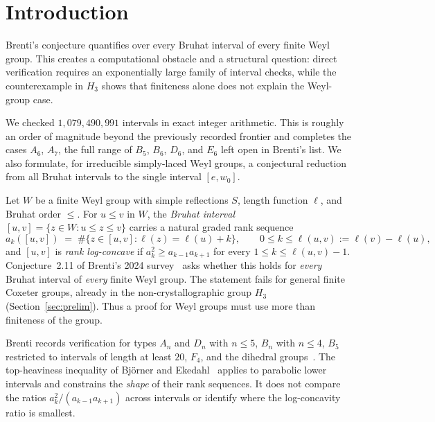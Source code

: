 \documentclass[11pt]{amsart}
\theoremstyle{plain}
\theoremstyle{definition}
\theoremstyle{remark}
\newcommand{\W}{W}
\begin{document}

\maketitle

\section{Introduction}
\label{sec:intro}

Brenti's conjecture quantifies over every Bruhat interval of every finite
Weyl group. This creates a computational obstacle and a structural
question: direct verification requires an exponentially large family of
interval checks, while the counterexample in $H_3$ shows that finiteness
alone does not explain the Weyl-group case.

We checked $1{,}079{,}490{,}991$ intervals in exact integer arithmetic.
This is roughly an order of magnitude beyond the previously recorded
frontier and completes the cases $A_6$, $A_7$, the full range of $B_5$,
$B_6$, $D_6$, and $E_6$ left open in Brenti's list. We also formulate, for
irreducible simply-laced Weyl groups, a conjectural reduction from all
Bruhat intervals to the single interval $[e,w_0]$.

Let $\W$ be a finite Weyl group with simple reflections $S$, length function
$\ell$, and Bruhat order $\le$. For $u\le v$ in $\W$, the \emph{Bruhat
interval} $[u,v]=\{z\in \W : u\le z\le v\}$ carries a natural graded rank
sequence
\[
a_k([u,v]) \;=\; \#\{z\in[u,v] : \ell(z)=\ell(u)+k\}, \qquad 0\le k\le
\ell(u,v):=\ell(v)-\ell(u),
\]
and $[u,v]$ is \emph{rank log-concave} if $a_k^2\ge a_{k-1}a_{k+1}$ for every
$1\le k\le \ell(u,v)-1$. Conjecture~2.11 of Brenti's 2024 survey~\cite{brenti2024open} asks whether this holds for
\emph{every} Bruhat interval of \emph{every} finite Weyl group. The
statement fails for general finite Coxeter groups, already in the
non-crystallographic group $H_3$ (Section~\ref{sec:prelim}). Thus a proof
for Weyl groups must use more than finiteness of the group.

Brenti records verification for types $A_n$ and $D_n$ with $n\le 5$,
$B_n$ with $n\le 4$, $B_5$ restricted to intervals of length at least
$20$, $F_4$, and the dihedral groups~\cite{brenti2024open}. The
top-heaviness inequality of Bj\"orner and
Ekedahl~\cite{bjorner-ekedahl} applies to parabolic lower intervals and
constrains the \emph{shape} of their rank sequences. It does not compare
the ratios $a_k^2/(a_{k-1}a_{k+1})$ across intervals or identify where the
log-concavity ratio is smallest.
\end{document}
